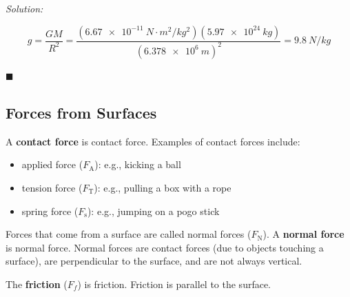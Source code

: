 \documentclass[dvipsnames]{article}
\begin{document}
\textit{Solution:}

\begin{equation*}
    g = \frac{GM}{R^2} = \frac{(\SI{6.67e-11}{N\cdot m^2/kg^2})(\SI{5.97e24}{kg})}{(\SI{6.378e6}{m})^2} = \boxed{\SI{9.8}{N/kg}}
\end{equation*}

\hfill $\blacksquare$


\subsection{Forces from Surfaces}

A \textbf{\gls{contact force}} is \glsdesc{contact force}. Examples of contact forces include:

\begin{itemize}[topsep=0pt,itemsep=0pt]
    \item applied force ($F_\mathrm{A}$): e.g., kicking a ball
    \item tension force ($F_\mathrm{T}$): e.g., pulling a box with a rope
    \item spring force ($F_\mathrm{s}$): e.g., jumping on a pogo stick
\end{itemize}


Forces that come from a surface are called normal forces ($F_\mathrm{N}$). A \textbf{\gls{normal force}} is \glsdesc{normal force}. Normal forces are contact forces (due to objects touching a surface), are perpendicular to the surface, and are not always vertical.

\begin{center}
\hspace{1.5cm}
\end{center}

The \textbf{\gls{friction}} ($F_f$) is \glsdesc{friction}. Friction is parallel to the surface.
\end{document}
